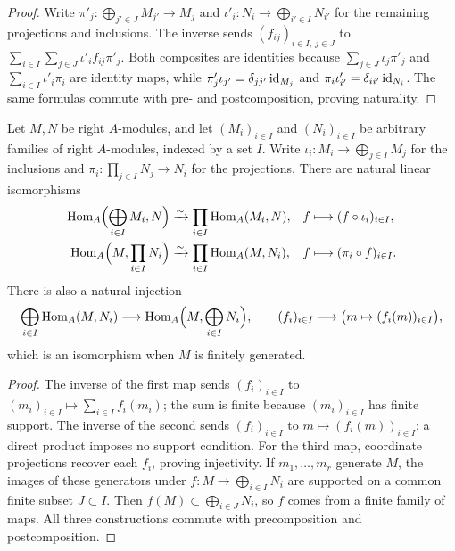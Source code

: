 \begin{supplementary}
\begin{proof}
Write $\pi'_j:\bigoplus_{j'\in J}M_{j'}\to M_j$ and $\iota'_i:N_i\to\bigoplus_{i'\in I}N_{i'}$ for the remaining projections and inclusions.
The inverse sends $(f_{ij})_{i\in I,\ j\in J}$ to $\sum_{i\in I}\sum_{j\in J}\iota'_if_{ij}\pi'_j$.
Both composites are identities because $\sum_{j\in J}\iota_j\pi'_j$ and $\sum_{i\in I}\iota'_i\pi_i$ are identity maps, while $\pi'_j\iota_{j'}=\delta_{jj'}\operatorname{id}_{M_j}$ and $\pi_i\iota'_{i'}=\delta_{ii'}\operatorname{id}_{N_i}$.
The same formulas commute with pre- and postcomposition, proving naturality.
\end{proof}
\end{supplementary}


\begin{advanced}
\begin{lemma}\label{lem:hom-sums-products}
Let $M,N$ be right $A$-modules, and let $(M_i)_{i\in I}$ and $(N_i)_{i\in I}$ be arbitrary families of right $A$-modules, indexed by a set $I$.
Write $\iota_i:M_i\to\bigoplus_{j\in I}M_j$ for the inclusions and $\pi_i:\prod_{j\in I}N_j\to N_i$ for the projections.
There are natural linear isomorphisms
\[
\begin{aligned}
\operatorname{Hom}\nolimits_A\Bigl(\bigoplus_{i\in I}M_i,N\Bigr)&\xrightarrow{\sim}\prod_{i\in I}\operatorname{Hom}\nolimits_A(M_i,N),
& f&\longmapsto(f\circ\iota_i)_{i\in I},\\
\operatorname{Hom}\nolimits_A\Bigl(M,\prod_{i\in I}N_i\Bigr)&\xrightarrow{\sim}\prod_{i\in I}\operatorname{Hom}\nolimits_A(M,N_i),
& f&\longmapsto(\pi_i\circ f)_{i\in I}.
\end{aligned}
\]
There is also a natural injection
\[
\bigoplus_{i\in I}\operatorname{Hom}\nolimits_A(M,N_i)\longrightarrow
\operatorname{Hom}\nolimits_A\Bigl(M,\bigoplus_{i\in I}N_i\Bigr),
\qquad (f_i)_{i\in I}\longmapsto\bigl(m\mapsto(f_i(m))_{i\in I}\bigr),
\]
which is an isomorphism when $M$ is finitely generated.
\end{lemma}

\begin{proof}
The inverse of the first map sends $(f_i)_{i\in I}$ to $(m_i)_{i\in I}\mapsto\sum_{i\in I}f_i(m_i)$; the sum is finite because $(m_i)_{i\in I}$ has finite support.
The inverse of the second sends $(f_i)_{i\in I}$ to $m\mapsto(f_i(m))_{i\in I}$; a direct product imposes no support condition.
For the third map, coordinate projections recover each $f_i$, proving injectivity.
If $m_1,\ldots,m_r$ generate $M$, the images of these generators under $f:M\to\bigoplus_{i\in I}N_i$ are supported on a common finite subset $J\subset I$.
Then $f(M)\subset\bigoplus_{i\in J}N_i$, so $f$ comes from a finite family of maps.
All three constructions commute with precomposition and postcomposition.
\end{proof}


\end{advanced}
